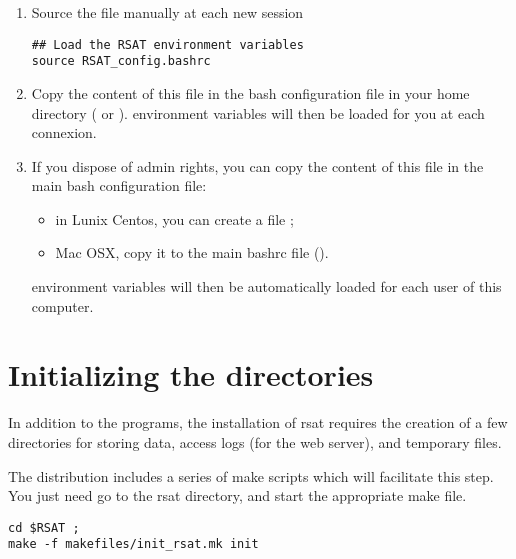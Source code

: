 \documentclass[12pt,a4paper, oneside]{scrreprt} %
\begin{document}
\begin{enumerate}

\item Source the file manually at each new session

\begin{lstlisting}
## Load the RSAT environment variables
source RSAT_config.bashrc
\end{lstlisting}

\item Copy the content of this file in the bash configuration file in
  your home directory ( or
  ). \RSAT environment variables will then be
  loaded for you at each connexion.

\item If you dispose of admin rights, you can copy the content of this
  file in the main bash configuration file: 
  \begin {itemize}
  \item in Lunix Centos, you can create a file
    ; 
  \item Mac OSX, copy it to the main bashrc file ().
  \end{itemize}
  \RSAT environment variables will then be automatically loaded for
  each user of this computer.
\end{enumerate}



\section{Initializing the directories}

In addition to the programs, the installation of rsat requires
the creation of a few directories for storing data, access logs (for
the web server), and temporary files.

The distribution includes a series of make scripts which will
facilitate this step. You just need go to the rsat directory, and
start the appropriate make file.

\begin{lstlisting}
cd $RSAT ; 
make -f makefiles/init_rsat.mk init
\end{lstlisting}

\end{document}
